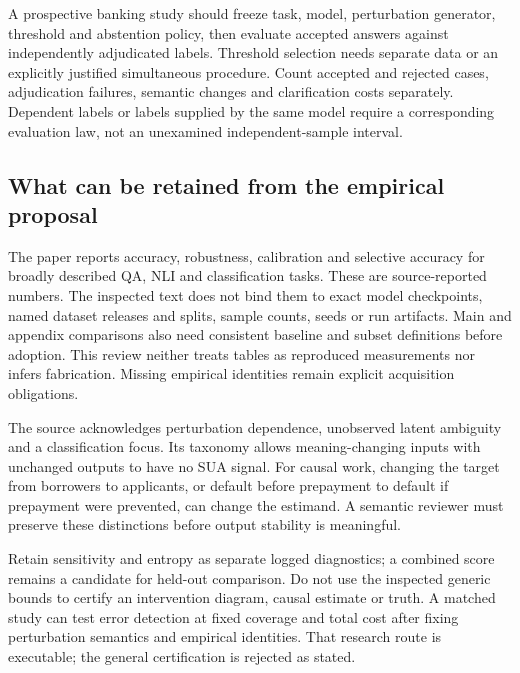 A prospective banking study should freeze task, model, perturbation generator,
threshold and abstention policy, then evaluate accepted answers against
independently adjudicated labels. Threshold selection needs separate data or
an explicitly justified simultaneous procedure. Count accepted and rejected
cases, adjudication failures, semantic changes and clarification costs
separately. Dependent labels or labels supplied by the same model require a
corresponding evaluation law, not an unexamined independent-sample interval.

\subsection{What can be retained from the empirical proposal}
The paper reports accuracy, robustness, calibration and selective accuracy for
broadly described QA, NLI and classification tasks. These are source-reported
numbers. The inspected text does not bind them to exact model checkpoints,
named dataset releases and splits, sample counts, seeds or run artifacts.
Main and appendix comparisons also need consistent baseline and subset
definitions before adoption. This review neither treats tables as reproduced
measurements nor infers fabrication. Missing empirical identities remain
explicit acquisition obligations. \citep{exec23_sua_original}

The source acknowledges perturbation dependence, unobserved latent ambiguity
and a classification focus. Its taxonomy allows meaning-changing inputs with
unchanged outputs to have no SUA signal. For causal work, changing the target
from borrowers to applicants, or default before prepayment to default if
prepayment were prevented, can change the estimand. A semantic reviewer must
preserve these distinctions before output stability is meaningful.
\citep{exec23_sua_original}

Retain sensitivity and entropy as separate logged diagnostics; a combined
score remains a candidate for held-out comparison. Do not use the inspected
generic bounds to certify an intervention diagram, causal estimate or truth.
A matched study can test error detection at fixed coverage and total cost
after fixing perturbation semantics and empirical identities. That research
route is executable; the general certification is rejected as stated.
